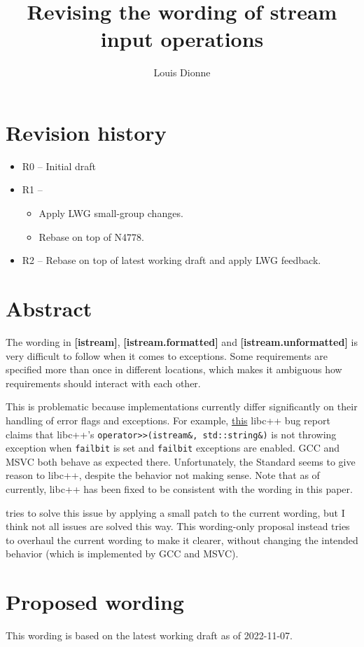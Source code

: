 \documentclass{wg21}
\title{Revising the wording of stream input operations}
\author{Louis Dionne}{ldionne@apple.com}
\newcommand{\cc}[1]{\texttt{#1}}
\begin{document}
\maketitle

\section{Revision history}
\begin{itemize}
  \item R0 -- Initial draft
  \item R1 -- \begin{itemize}
              \item Apply LWG small-group changes.
              \item Rebase on top of N4778.
              \end{itemize}
  \item R2 -- Rebase on top of latest working draft and apply LWG feedback.
\end{itemize}

\section{Abstract}
The wording in \textbf{[istream]}, \textbf{[istream.formatted]} and
\textbf{[istream.unformatted]} is very difficult to follow when it comes
to exceptions. Some requirements are specified more than once in different
locations, which makes it ambiguous how requirements should interact with
each other.

This is problematic because implementations currently differ significantly
on their handling of error flags and exceptions. For example,
\href{https://llvm.org/PR21586}{this} libc++ bug
report claims that libc++'s \break \cc{operator>>(istream&, std::string&)} is
not throwing exception when \cc{failbit} is set and \cc{failbit} exceptions
are enabled. GCC and MSVC both behave as expected there. Unfortunately, the
Standard seems to give reason to libc++, despite the behavior not making sense.
Note that as of currently, libc++ has been fixed to be consistent with the
wording in this paper.

\cite{LWG2349} tries to solve this issue by applying a small patch to the current
wording, but I think not all issues are solved this way. This wording-only
proposal instead tries to overhaul the current wording to make it clearer,
without changing the intended behavior (which is implemented by GCC and MSVC).


\section{Proposed wording}
This wording is based on the latest working draft as of 2022-11-07.
\end{document}
